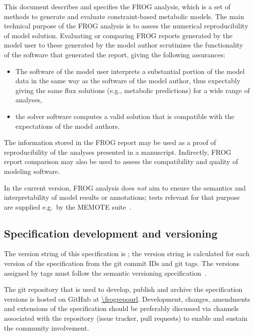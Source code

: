 This document describes and specifies the FROG analysis, which is a set of methods to generate and evaluate constraint-based metabolic models. The main technical purpose of the FROG analysis is to assess the numerical reproducibility of model solution. Evaluating or comparing FROG reports generated by the model user to these generated by the model author scrutinizes the functionality of the software that generated the report, giving the following assurances:
\begin{itemize}
\item The software of the model user interprets a substantial portion of the model data in the same way as the software of the model author, thus expectably giving the same flux solutions (e.g., metabolic predictions) for a wide range of analyses,
\item the solver software computes a valid solution that is compatible with the expectations of the model authors.
\end{itemize}

The information stored in the FROG report may be used as a proof of reproducibility of the analyses presented in a manuscript. Indirectly, FROG report comparison may also be used to assess the compatibility and quality of modeling software.

In the current version, FROG analysis does \emph{not} aim to ensure the semantics and interpretability of model results or annotations; tests relevant for that purpose are supplied e.g.~by the MEMOTE suite~\cite{lieven2020memote}.

\subsection{Specification development and versioning}

The version string of this specification is \texttt{\frogspecversion}; the version string is calculated for each version of the specification from the git commit IDs and git tags. The versions assigned by tags must follow the semantic versioning specification~\cite{semver}.

The git repository that is used to develop, publish and archive the specification versions is hosted on GitHub at \url{\frogrepourl}. Development, changes, amendments and extensions of the specification should be preferably discussed via channels associated with the repository (issue tracker, pull requests) to enable and sustain the community involvement.

